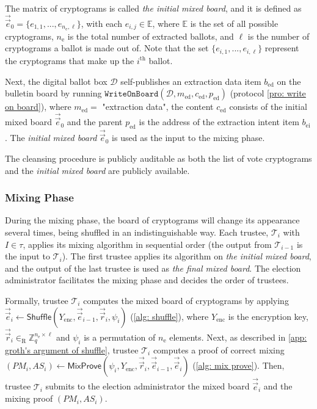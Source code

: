 The matrix of cryptograms is called \textit{the initial mixed board}, and it is defined as $\vec{\vec{e}}_0 = \{ e_{1, 1}, ..., e_{n_\mathrm{e}, \ell} \}$, with each $e_{i, j} \in \mathbb{E}$, where $\mathbb{E}$ is the set of all possible cryptograms, $n_\mathrm{e}$ is the total number of extracted ballots, and $\ell$ is the number of cryptograms a ballot is made out of. Note that the set $\{ e_{i, 1}, ..., e_{i, \ell} \}$ represent the cryptograms that make up the $i^\mathrm{th}$ ballot.

Next, the digital ballot box $\mathcal{D}$ self-publishes an extraction data item $b_\mathrm{ed}$ on the bulletin board by running $\mathtt{WriteOnBoard}(\mathcal{D}, m_\mathrm{ed}, c_\mathrm{ed}, p_\mathrm{ed})$ (protocol \ref{pro: write on board}), where $m_\mathrm{ed} = $ "extraction data", the content $c_\mathrm{ed}$ consists of the initial mixed board $\vec{\vec{e}}_0$ and the parent $p_\mathrm{ed}$ is the address of the extraction intent item $b_\mathrm{ei}$. The \textit{initial mixed board} $\vec{\vec{e}}_0$ is used as the input to the mixing phase.

The cleansing procedure is publicly auditable as both the list of vote cryptograms and the \textit{initial mixed board} are publicly available.


\subsubsection{Mixing Phase} \label{sec: mixing phase}
During the mixing phase, the board of cryptograms will change its appearance several times, being shuffled in an indistinguishable way. Each trustee, $\mathcal{T}_i$ with $I \in \tau$, applies its mixing algorithm in sequential order (the output from $\mathcal{T}_{i-1}$ is the input to $\mathcal{T}_i$). The first trustee applies its algorithm on \textit{the initial mixed board}, and the output of the last trustee is used as \textit{the final mixed board}. The election administrator facilitates the mixing phase and decides the order of trustees.

Formally, trustee $\mathcal{T}_i$ computes the mixed board of cryptograms by applying $\vec{\vec{e}}_i \gets \mathsf{Shuffle}(Y_\mathrm{enc}, \vec{\vec{e}}_{i-1}, \vec{\vec{r}}_i, \psi_i)$ (\cref{alg: shuffle}), where $Y_\mathrm{enc}$ is the encryption key, $\vec{\vec{r}}_i \in_\mathrm{R} \mathbb{Z}_q^{n_\mathrm{e} \times \ell}$ and $\psi_i$ is a permutation of $n_\mathrm{e}$ elements. Next, as described in \cref{app: groth's argument of shuffle}, trustee $\mathcal{T}_i$ computes a proof of correct mixing $(PM_i, AS_i) \gets \mathsf{MixProve}(\psi_i, Y_\mathrm{enc}, \vec{\vec{r}}_i, \vec{\vec{e}}_{i-1}, \vec{\vec{e}}_i)$ (\cref{alg: mix prove}). Then, trustee $\mathcal{T}_i$ submits to the election administrator the mixed board $\vec{\vec{e}}_i$ and the mixing proof $(PM_i, AS_i)$.

